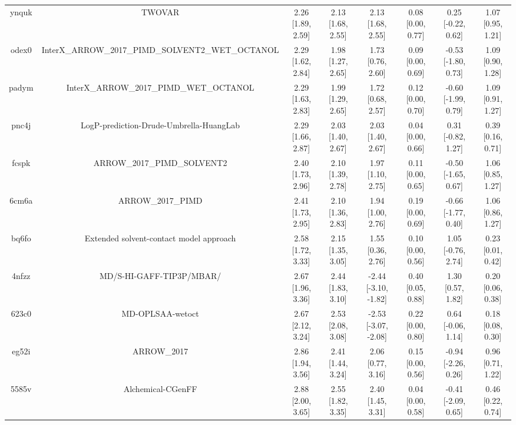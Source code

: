 \documentclass{article}
\begin{document}
\begin{center}
\begin{longtable}{|cccccccc|}
 ynquk &                                             TWOVAR &  2.26 [1.89, 2.59] &  2.13 [1.68, 2.55] &     2.13 [1.68, 2.55] &  0.08 [0.00, 0.77] &   0.25 [-0.22, 0.62] &     1.07 [0.95, 1.21] \\
 odex0 &  InterX\_ARROW\_2017\_PIMD\_SOLVENT2\_WET\_OCTANOL &  2.29 [1.62, 2.84] &  1.98 [1.27, 2.65] &     1.73 [0.76, 2.60] &  0.09 [0.00, 0.69] &  -0.53 [-1.80, 0.73] &     1.09 [0.90, 1.28] \\
 padym &            InterX\_ARROW\_2017\_PIMD\_WET\_OCTANOL &  2.29 [1.63, 2.83] &  1.99 [1.29, 2.65] &     1.72 [0.68, 2.57] &  0.12 [0.00, 0.70] &  -0.60 [-1.99, 0.79] &     1.09 [0.91, 1.27] \\
 pnc4j &            LogP-prediction-Drude-Umbrella-HuangLab &  2.29 [1.66, 2.87] &  2.03 [1.40, 2.67] &     2.03 [1.40, 2.67] &  0.04 [0.00, 0.66] &   0.31 [-0.82, 1.27] &     0.39 [0.16, 0.71] \\
 fcspk &                        ARROW\_2017\_PIMD\_SOLVENT2 &  2.40 [1.73, 2.96] &  2.10 [1.39, 2.78] &     1.97 [1.10, 2.75] &  0.11 [0.00, 0.65] &  -0.50 [-1.65, 0.67] &     1.06 [0.85, 1.27] \\
 6cm6a &                                  ARROW\_2017\_PIMD &  2.41 [1.73, 2.95] &  2.10 [1.36, 2.83] &     1.94 [1.00, 2.76] &  0.19 [0.00, 0.69] &  -0.66 [-1.77, 0.40] &     1.06 [0.86, 1.27] \\
 bq6fo &            Extended solvent-contact model approach &  2.58 [1.72, 3.33] &  2.15 [1.35, 3.05] &     1.55 [0.36, 2.76] &  0.10 [0.00, 0.56] &   1.05 [-0.76, 2.74] &     0.23 [0.01, 0.42] \\
 4nfzz &                           MD/S-HI-GAFF-TIP3P/MBAR/ &  2.67 [1.96, 3.36] &  2.44 [1.83, 3.10] &  -2.44 [-3.10, -1.82] &  0.40 [0.05, 0.88] &    1.30 [0.57, 1.82] &     0.20 [0.06, 0.38] \\
 623c0 &                                   MD-OPLSAA-wetoct &  2.67 [2.12, 3.24] &  2.53 [2.08, 3.08] &  -2.53 [-3.07, -2.08] &  0.22 [0.00, 0.80] &   0.64 [-0.06, 1.14] &     0.18 [0.08, 0.30] \\
 eg52i &                                        ARROW\_2017 &  2.86 [1.94, 3.56] &  2.41 [1.44, 3.24] &     2.06 [0.77, 3.16] &  0.15 [0.00, 0.56] &  -0.94 [-2.26, 0.26] &     0.96 [0.71, 1.22] \\
 5585v &                                  Alchemical-CGenFF &  2.88 [2.00, 3.65] &  2.55 [1.82, 3.35] &     2.40 [1.45, 3.31] &  0.04 [0.00, 0.58] &  -0.41 [-2.09, 0.65] &     0.46 [0.22, 0.74] \\

\end{longtable}
\end{center}
\end{document}
